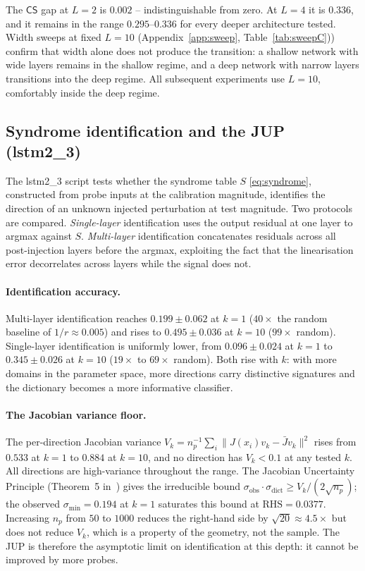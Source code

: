 \documentclass[11pt,a4paper]{article}
\newcommand{\CS}{\mathsf{CS}}
\newcommand{\Jbar}{\bar{J}}
\begin{document}
The $\CS$ gap at $L = 2$ is $0.002$ -- indistinguishable from zero. At $L = 4$ it is $0.336$, and it remains in the range $0.295$--$0.336$ for every deeper architecture tested. Width sweeps at fixed $L = 10$ (Appendix~\ref{app:sweep}, Table~\ref{tab:sweepC})) confirm that width alone does not produce the transition: a shallow network with wide layers remains in the shallow regime, and a deep network with narrow layers transitions into the deep regime. All subsequent experiments use $L = 10$, comfortably inside the deep regime.


\subsection{Syndrome identification and the JUP (lstm2\_3)}
\label{sec:exp-idacc}

The lstm2\_3 script tests whether the syndrome table $S$ \eqref{eq:syndrome}, constructed from probe inputs at the calibration magnitude, identifies the direction of an unknown injected perturbation at test magnitude. Two protocols are compared. \emph{Single-layer} identification uses the output residual at one layer to argmax against $S$. \emph{Multi-layer} identification concatenates residuals across all post-injection layers before the argmax, exploiting the fact that the linearisation error decorrelates across layers while the signal does not.

\paragraph{Identification accuracy.} Multi-layer identification reaches $0.199 \pm 0.062$ at $k = 1$ ($40\times$ the random baseline of $1/r
\approx 0.005$) and rises to $0.495 \pm 0.036$ at $k = 10$ ($99\times$ random). Single-layer identification is uniformly lower, from $0.096 \pm
0.024$ at $k = 1$ to $0.345 \pm 0.026$ at $k = 10$ ($19\times$ to $69\times$ random). Both rise with $k$: with more domains in the parameter space, more directions carry distinctive signatures and the dictionary becomes a more informative classifier.

\paragraph{The Jacobian variance floor.} The per-direction Jacobian variance $V_k = n_p^{-1} \sum_i \|J(x_i)v_k - \Jbar v_k\|^2$ rises from $0.533$ at $k = 1$ to $0.884$ at $k = 10$, and no direction has $V_k <
0.1$ at any tested $k$. All directions are high-variance throughout the range. The Jacobian Uncertainty Principle (Theorem~5 in~\cite{SyndromeAlgebra}) gives the irreducible bound $\sigma_{\mathrm{obs}} \cdot \sigma_{\mathrm{dict}} \geq V_k / (2\sqrt{n_p})$; the observed $\sigma_{\min} = 0.194$ at $k = 1$ saturates this bound at $\mathrm{RHS} = 0.0377$. Increasing $n_p$ from $50$ to $1000$ reduces the right-hand side by $\sqrt{20} \approx 4.5\times$ but does not reduce $V_k$, which is a property of the geometry, not the sample. The JUP is therefore the asymptotic limit on identification at this depth: it cannot be improved by more probes.
\end{document}
